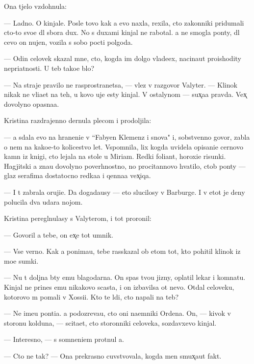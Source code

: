 \documentclass[10pt]{book}
\begin{document}
Ona t{\ia}jelo vzdohnula:

— Ladno. O kinjale. Posle tovo kak {\y}a {\y}evo naxla, rexila, cto zakonniki pridumali cto-to svo{\y}e dl{\ia} sbora dux. No s duxami kinjal ne rabotal. {\Y}a ne smogla pon{\ia}ty, dl{\ia} cevo on nujen, vozila s sobo{\y} pocti polgoda.

— Odin celovek skazal mne, cto, kogda im dolgo vlade{\y}ex, nacina{\y}ut pro{\y}ishodity nepri{\y}atnosti. U teb{\ia} tako{\y}e b{\yi}lo?

— Na straje{\y} pravilo ne rasprostran{\ia}{\y}etsa, — vlez v razgovor Valyter. — Klinok nikak ne vli{\y}a{\y}et na teh, u kovo uje {\y}esty kinjal{\yi}. V ostalynom — sux̨a{\y}a pravda. Vex̨ dovolyno opasna{\y}a.

Kristina razdrajenno dernula plecom i prodoljila:

— {\Y}a sdala {\y}evo na hraneni{\y}e v ``Fabyen Klemenz i s{\yi}nov{\y}a" i, sobstvenno govor{\ia}, zab{\yi}la o nem na kako{\y}e-to kolicestvo let. Vspomnila, lix kogda uvidela opisani{\y}e cernovo kamn{\ia} iz knigi, cto lejala na stole u Miriam. Redki{\y} foliant, horoxi{\y}e risunki. Hagjitski{\y} {\y}a zna{\y}u dovolyno poverhnostno, no procitannovo hvatilo, ctob{\yi} pon{\ia}ty — glaz serafima dostatocno redka{\y}a i qenna{\y}a vex̨iqa.

— I t{\yi} zabrala oruji{\y}e. Da{\y} dogada{\y}usy — eto slucilosy v Barburge. I v etot je deny polucila dva udara nojom.

Kristina peregl{\ia}nulasy s Valyterom, i tot proronil:

— Govoril {\y}a tebe, on {\y}ex̨e tot umnik.

— Vse verno. Kak {\y}a ponima{\y}u, tebe rasskazal ob etom tot, kto pohitil klinok iz mo{\y}e{\y} sumki.

— Nu t{\yi} doljna b{\yi}ty {\y}emu blagodarna. On spas tvo{\y}u jizny, oplatil lekar{\ia} i komnatu. Kinjal ne prines {\y}emu nikakovo scast{\y}a, i on izbavilsa ot nevo. Otdal celoveku, kotorovo m{\yi} po{\y}mali v Xossi{\y}i. Kto te l{\iu}di, cto napali na teb{\ia}?

— Ne ime{\y}u pon{\ia}ti{\y}a. {\Y}a podozreva{\y}u, cto oni na{\y}emniki Ordena. On, — kivok v storonu kolduna, — scita{\y}et, cto storonniki celoveka, sozdavxevo kinjal.

— Interesno, — s somneni{\y}em prot{\ia}nul {\y}a.

— Cto ne tak? — Ona prekrasno cuvstvovala, kogda men{\ia} smux̨a{\y}ut fakt{\yi}.
\end{document}
